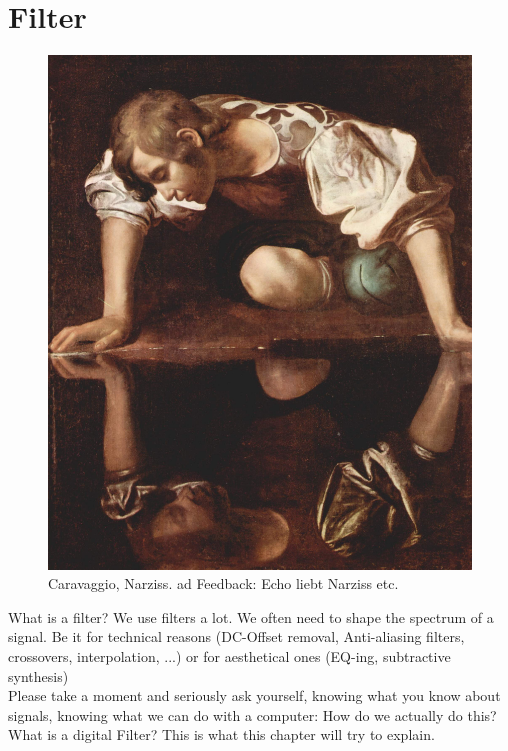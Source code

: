 \chapter{Filter}
\label{chap:filters}


\begin{figure}[H]
	\begin{center}
		\includegraphics[width = 14cm]{img/Narciss_Caravaggio.jpg}
		\caption{Caravaggio, Narziss. ad Feedback: Echo liebt Narziss etc.}
		\label{fig:name}
	\end{center}
\end{figure}





What is a filter? We use filters a lot. We often need to shape the spectrum of a signal. Be it for technical reasons (DC-Offset removal, Anti-aliasing filters, crossovers, interpolation, ...) or for aesthetical ones (EQ-ing, subtractive synthesis)\\
Please take a moment and seriously ask yourself, knowing what you know about signals, knowing what we can do with a computer: How do we actually do this? What is a digital Filter? This is what this chapter will try to explain.\\

